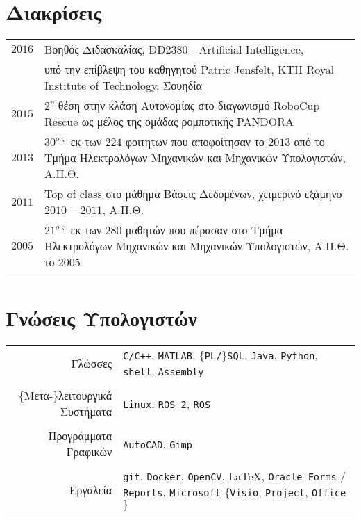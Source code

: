 \documentclass[a4paper,10pt,twoside]{article}
\begin{document}
\section{Διακρίσεις}
\begin{tabular}{rp{14cm}}

$2016$ & Βοηθός Διδασκαλίας, DD2380 - Artificial Intelligence, \\ & υπό την επίβλεψη του καθηγητού Patric Jensfelt, KTH Royal Institute of Technology, Σουηδία\\


$2015$ & $2^{\eta}$ θέση στην κλάση Αυτονομίας στο διαγωνισμό RoboCup Rescue ως μέλος της ομάδας ρομποτικής PANDORA \\


$2013$ & $30^{o\varsigma}$ εκ των $224$ φοιτητων που αποφοίτησαν το $2013$ από το Tμήμα Ηλεκτρολόγων Μηχανικών και Μηχανικών Υπολογιστών, Α.Π.Θ. \\


$2011$ & Top of class στο μάθημα Βάσεις Δεδομένων, χειμερινό εξάμηνο $2010 - 2011$, Α.Π.Θ. \\


$2005$ & $21^{o\varsigma}$ εκ των $280$ μαθητών που πέρασαν στο Tμήμα Ηλεκτρολόγων Μηχανικών και Μηχανικών Υπολογιστών, Α.Π.Θ. το $2005$\\
&\\
\end{tabular}





\section{Γνώσεις Υπολογιστών}

\begin{tabular}{rp{9cm}}
  Γλώσσες & \texttt{C/C++}, \texttt{MATLAB}, $\{$\texttt{PL/}$\}$\texttt{SQL}, \texttt{Java}, \texttt{Python}, \texttt{shell}, \texttt{Assembly}\\
&\\
  $\{$Μετα-$\}$λειτουργικά Συστήματα & \texttt{Linux}, \texttt{ROS 2}, \texttt{ROS}  \\
&\\
  Προγράμματα Γραφικών & \texttt{AutoCAD}, \texttt{Gimp}\\
&\\
  Εργαλεία & \texttt{git}, \texttt{Docker}, \texttt{OpenCV}, \LaTeX, \texttt{Oracle Forms} / \texttt{Reports}, \texttt{Microsoft} $\{$\texttt{Visio}, \texttt{Project}, \texttt{Office}$\}$
\end{tabular}
\end{document}
